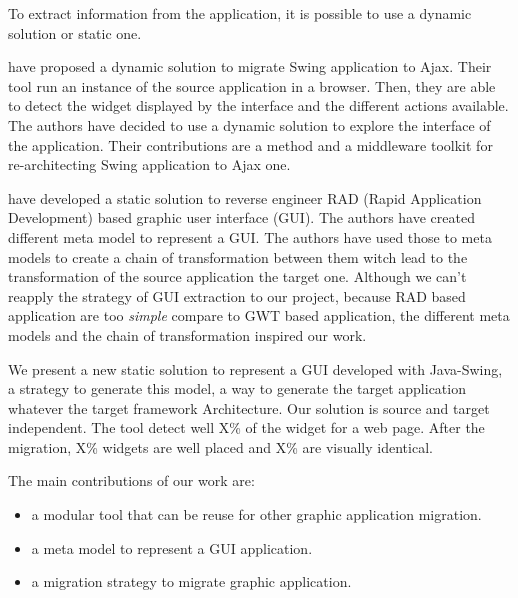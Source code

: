 \documentclass[conference]{IEEEtran}
\begin{document}
To extract information from the application, it is possible to use a dynamic solution or static one. 

\cite{samir2007swing2script} have proposed a dynamic solution to migrate Swing application to Ajax.
Their tool run an instance of the source application in a browser.
Then, they are able to detect the widget displayed by the interface and the different actions available.
The authors have decided to use a dynamic solution to explore the interface of the application.
Their contributions are a method and a middleware toolkit for re-architecting Swing application to Ajax one.

\cite{sanchez2014model} have developed a static solution to reverse engineer RAD (Rapid Application Development) based graphic user interface (GUI).
The authors have created different meta model to represent a GUI.
The authors have used those to meta models to create a chain of transformation between them witch lead to the transformation of 
    the source  application the target one.
Although we can't reapply the strategy of GUI extraction to our project, because RAD based application are too \emph{simple} compare to GWT based application,
    the different meta models and the chain of transformation inspired our work.


We present a new static solution to represent a GUI developed with Java-Swing, 
    a strategy to generate this model,
    a way to generate the target application whatever the target framework Architecture.
Our solution is source and target independent.
The tool detect well X\% of the widget for a web page.
After the migration, X\% widgets are well placed and X\% are visually identical.


The main contributions of our work are:
\begin{itemize}

    \item a modular tool that can be reuse for other graphic application migration.

    \item a meta model to represent a GUI application.

    \item a migration strategy to migrate graphic application.
    
\end{itemize}
\end{document}
